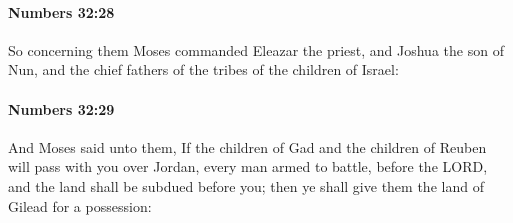 		\paragraph{Numbers 32:28} %
			\label{NUMBERS-32-28}

			So concerning them Moses commanded Eleazar the priest, and Joshua the son of Nun, and the chief fathers of the tribes of the children of Israel:


		\paragraph{Numbers 32:29} %
			\label{NUMBERS-32-29}

			And Moses said unto them, If the children of Gad and the children of Reuben will pass with you over Jordan, every man armed to battle, before the LORD, and the land shall be subdued before you; then ye shall give them the land of Gilead for a possession:

